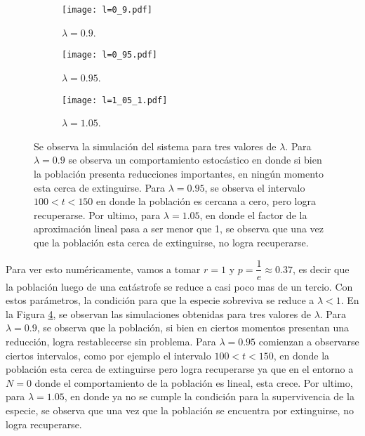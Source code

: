 \begin{figure}[hb!]
    \centering
    \begin{subfigure}[b]{0.32\textwidth}
        \texttt{[image: l=0\_9.pdf]}
        \caption{$\lambda=0.9$.}
        \label{05_l_9}
    \end{subfigure}
    \hfill
    \begin{subfigure}[b]{0.32\textwidth}
        \texttt{[image: l=0\_95.pdf]}
        \caption{$\lambda=0.95$.}
        \label{05_l_95}
    \end{subfigure}
    \hfill
    \begin{subfigure}[b]{0.32\textwidth}
        \texttt{[image: l=1\_05\_1.pdf]}
        \caption{$\lambda=1.05$.}
        \label{05_l_105}
    \end{subfigure}
    \caption{Se observa la simulación del sistema para tres valores de $\lambda$. Para $\lambda=0.9$ se observa un comportamiento estocástico en donde si bien la población presenta reducciones importantes, en ningún momento esta cerca de extinguirse. Para $\lambda=0.95$, se observa el intervalo $100<t<150$ en donde la población es cercana a cero, pero logra recuperarse. Por ultimo, para $\lambda=1.05$, en donde el factor de la aproximación lineal pasa a ser menor que 1, se observa que una vez que la población esta cerca de extinguirse, no logra recuperarse.}
    \label{05_ejercicio}
\end{figure}

Para ver esto numéricamente, vamos a tomar $r=1$ y $p=\dfrac{1}{e}\approx0.37$, es decir que la población luego de una catástrofe se reduce a casi poco mas de un tercio. Con estos parámetros, la condición para que la especie sobreviva se reduce a $\lambda<1$. En la Figura \ref{05_ejercicio}, se observan las simulaciones obtenidas para tres valores de $\lambda$. Para $\lambda=0.9$, se observa que la población, si bien en ciertos momentos presentan una reducción, logra restablecerse sin problema. Para $\lambda=0.95$ comienzan a observarse ciertos intervalos, como por ejemplo el intervalo $100<t<150$, en donde la población esta cerca de extinguirse pero logra recuperarse ya que en el entorno a $N=0$ donde el comportamiento de la población es lineal, esta crece. Por ultimo, para $\lambda=1.05$, en donde ya no se cumple la condición para la supervivencia de la especie, se observa que una vez que la población se encuentra por extinguirse, no logra recuperarse. 



